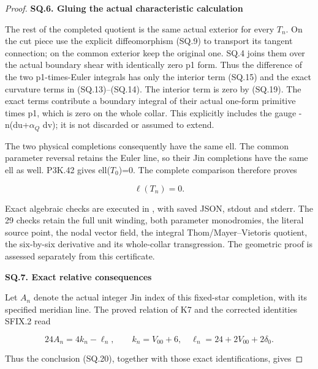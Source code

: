 \begin{proof}
\par

\medskip\noindent\textbf{SQ.6. Gluing the actual characteristic calculation}

\par\nobreak

The rest of the completed quotient is the same actual exterior for
every \(T_{n}\). On the cut piece use the explicit diffeomorphism (SQ.9)
to transport its tangent connection; on the common exterior keep
the original one. SQ.4 joins them over the actual boundary shear
with identically zero p1 form. Thus the difference of the two
p1-times-Euler integrals has only the interior term (SQ.15) and
the exact curvature terms in (SQ.13)--(SQ.14). The interior term
is zero by (SQ.19). The exact terms contribute a boundary integral
of their actual one-form primitive times p1, which is zero on the
whole collar. This explicitly includes the gauge
-n(du+\(\alpha_{Q}\) dv); it is not discarded or assumed to extend.

The two physical completions consequently have the same ell.
The common parameter reversal retains the Euler line, so their
Jin completions have the same ell as well. P3K.42 gives ell(\(T_{0}\))=0.
The complete comparison therefore proves

\[
                              \ell(T_n)=0.              \tag{SQ.20}
\]

Exact algebraic checks are executed in , with saved JSON, stdout and stderr. The 29 checks retain the full unit winding, both parameter monodromies, the literal source point, the nodal vector field, the integral Thom/Mayer--Vietoris quotient, the six-by-six derivative and its whole-collar transgression. The geometric proof is assessed separately from this certificate.

\par

\medskip\noindent\textbf{SQ.7. Exact relative consequences}

\par\nobreak

Let \(A_{n}\) denote the actual integer Jin index of this fixed-star
completion, with its specified meridian line. The proved relation of
K7 and the corrected identities SFIX.2 read

\[
 24A_n=4k_n-\ell_n,\qquad
 k_n=V_{00}+6,\quad
 \ell_n=24+2V_{00}+2\delta_0.
\]

Thus the conclusion (SQ.20), together with those exact identifications,
gives


\end{proof}
